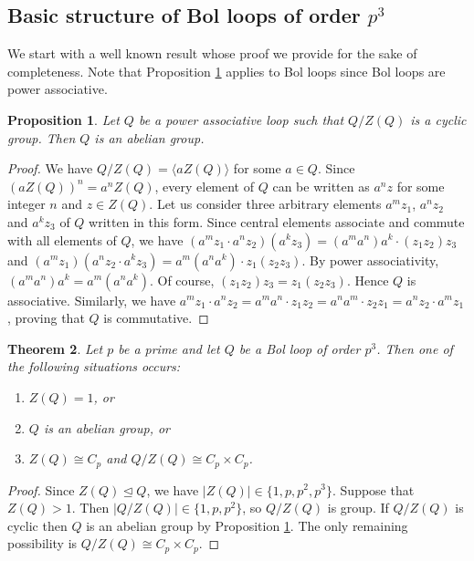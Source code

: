 \documentclass[12pt,reqno]{amsart}
\numberwithin{equation}{section}
\theoremstyle{plain}
\newtheorem{theorem}{Theorem}[section]
\newtheorem{proposition}[theorem]{Proposition}
\theoremstyle{definition}
\begin{document}
\subsection{Basic structure of Bol loops of order $p^3$}

We start with a well known result whose proof we provide for the sake of completeness. Note that Proposition \ref{Pr:CyclicFactor} applies to Bol loops since Bol loops are power associative.

\begin{proposition}\label{Pr:CyclicFactor}
Let $Q$ be a power associative loop such that $Q/Z(Q)$ is a cyclic group. Then $Q$ is an abelian group.
\end{proposition}
\begin{proof}
We have $Q/Z(Q)=\langle aZ(Q)\rangle$ for some $a\in Q$. Since $(aZ(Q))^n = a^nZ(Q)$, every element of $Q$ can be written as $a^nz$ for some integer $n$ and $z\in Z(Q)$. Let us consider three arbitrary elements $a^mz_1$, $a^nz_2$ and $a^kz_3$ of $Q$ written in this form. Since central elements associate and commute with all elements of $Q$, we have $(a^mz_1\cdot a^nz_2)(a^kz_3) = (a^ma^n)a^k\cdot (z_1z_2)z_3$ and $(a^mz_1) (a^nz_2\cdot a^kz_3) = a^m(a^na^k)\cdot z_1(z_2z_3)$. By power associativity, $(a^ma^n)a^k = a^m(a^na^k)$. Of course, $(z_1z_2)z_3 = z_1(z_2z_3)$. Hence $Q$ is associative. Similarly, we have $a^mz_1\cdot a^nz_2 =a^ma^n\cdot z_1z_2 = a^na^m\cdot z_2z_1 = a^nz_2\cdot a^mz_1$, proving that $Q$ is commutative.
\end{proof}

\begin{theorem}\label{Th:Structure}
Let $p$ be a prime and let $Q$ be a Bol loop of order $p^3$. Then one of the following situations occurs:
\begin{enumerate}
\item[(i)] $Z(Q)=1$, or
\item[(ii)] $Q$ is an abelian group, or
\item[(iii)] $Z(Q)\cong C_p$ and $Q/Z(Q)\cong C_p\times C_p$.
\end{enumerate}
\end{theorem}
\begin{proof}
Since $Z(Q)\unlhd Q$, we have $|Z(Q)|\in\{1,p,p^2,p^3\}$. Suppose that $Z(Q)>1$. Then $|Q/Z(Q)|\in\{1,p,p^2\}$, so $Q/Z(Q)$ is group. If $Q/Z(Q)$ is cyclic then $Q$ is an abelian group by Proposition \ref{Pr:CyclicFactor}. The only remaining possibility is $Q/Z(Q)\cong C_p\times C_p$.
\end{proof}
\end{document}
